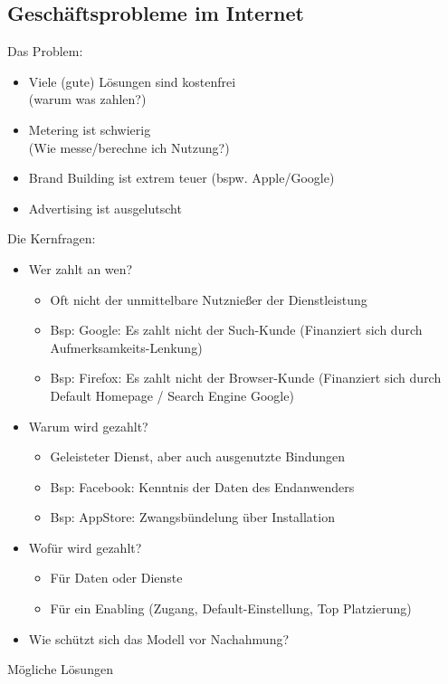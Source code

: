 \documentclass{article} %
\begin{document}
		\subsection{Geschäftsprobleme im Internet}
			Das Problem:
			\begin{itemize}
				\item Viele (gute) Lösungen sind kostenfrei\\
				(warum was zahlen?)
				\item Metering ist schwierig\\
				(Wie messe/berechne ich Nutzung?)
				\item Brand Building ist extrem teuer (bspw. Apple/Google)
				\item Advertising ist ausgelutscht				
			\end{itemize}
			Die Kernfragen:
			\begin{itemize}
				\item Wer zahlt an wen?
					\begin{itemize}
						\item Oft nicht der unmittelbare Nutznießer der Dienstleistung
						\item Bsp: Google: Es zahlt nicht der Such-Kunde (Finanziert sich durch Aufmerksamkeits-Lenkung)
						\item Bsp: Firefox: Es zahlt nicht der Browser-Kunde (Finanziert sich durch Default Homepage / Search Engine Google)
					\end{itemize}
				\item Warum wird gezahlt? 
					\begin{itemize}
						\item Geleisteter Dienst, aber auch ausgenutzte Bindungen
						\item Bsp: Facebook: Kenntnis der Daten des Endanwenders
						\item Bsp: AppStore: Zwangsbündelung über Installation
					\end{itemize}
				\item Wofür wird gezahlt?
					\begin{itemize}
						\item Für Daten oder Dienste
						\item Für ein Enabling (Zugang, Default-Einstellung, Top Platzierung)
					\end{itemize}
				\item Wie schützt sich das Modell vor Nachahmung?
			\end{itemize}
		Mögliche Lösungen
\end{document}
